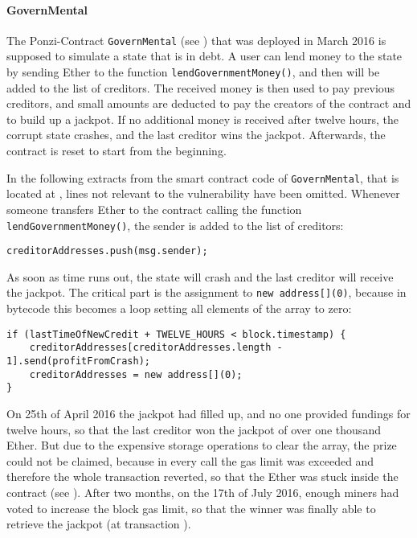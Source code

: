 \paragraph{GovernMental}
The Ponzi-Contract \texttt{GovernMental} (see \cite{github:governmental}) that was deployed in March 2016 is supposed to simulate a state that is in debt. A user can lend money to the state by sending Ether to the function \texttt{lendGovernmentMoney()}, and then will be added to the list of creditors. The received money is then used to pay previous creditors, and small amounts are deducted to pay the creators of the contract and to build up a jackpot. If no additional money is received after twelve hours, the corrupt state crashes, and the last creditor wins the jackpot. Afterwards, the contract is reset to start from the beginning.

In the following extracts from the smart contract code of \texttt{GovernMental}, that is located at \cite{etherscan:governmental:code}, lines not relevant to the vulnerability have been omitted. Whenever someone transfers Ether to the contract calling the function \texttt{lendGovernmentMoney()}, the sender is added to the list of creditors:
\begin{verbatim}
creditorAddresses.push(msg.sender);
\end{verbatim}

As soon as time runs out, the state will crash and the last creditor will receive the jackpot. The critical part is the assignment to \texttt{new address[](0)}, because in bytecode this becomes a loop setting all elements of the array to zero:
\begin{verbatim}
if (lastTimeOfNewCredit + TWELVE_HOURS < block.timestamp) {
	creditorAddresses[creditorAddresses.length - 1].send(profitFromCrash);
	creditorAddresses = new address[](0);
}
\end{verbatim}

On 25th of April 2016 the jackpot had filled up, and no one provided fundings for twelve hours, so that the last creditor won the jackpot of over one thousand Ether. But due to the expensive storage operations to clear the array, the prize could not be claimed, because in every call the gas limit was exceeded and therefore the whole transaction reverted, so that the Ether was stuck inside the contract (see \cite{reddit:governmental}). After two months, on the 17th of July 2016, enough miners had voted to increase the block gas limit, so that the winner was finally able to retrieve the jackpot (at transaction \cite{etherscan:governmental:retrieve}).
